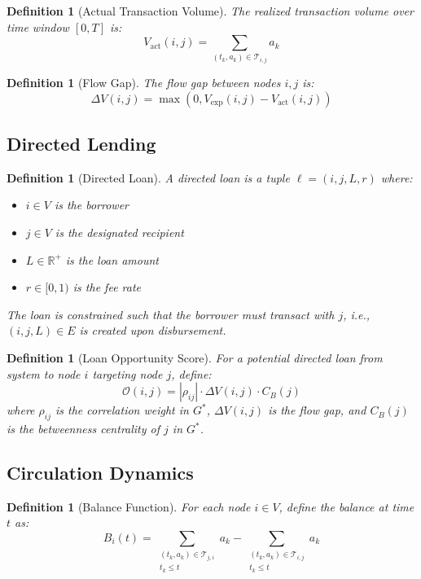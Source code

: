 \documentclass[12pt]{article}
\newtheorem{definition}[theorem]{Definition}
\begin{document}
\begin{definition}[Actual Transaction Volume]
The realized transaction volume over time window $[0,T]$ is:
$$
V_{\text{act}}(i,j) = \sum_{(t_k, a_k) \in \mathcal{T}_{i,j}} a_k
$$
\end{definition}

\begin{definition}[Flow Gap]
The flow gap between nodes $i,j$ is:
$$
\Delta V(i,j) = \max(0, V_{\text{exp}}(i,j) - V_{\text{act}}(i,j))
$$
\end{definition}

\subsection{Directed Lending}

\begin{definition}[Directed Loan]
A directed loan is a tuple $\ell = (i, j, L, r)$ where:
\begin{itemize}
    \item $i \in V$ is the borrower
    \item $j \in V$ is the designated recipient
    \item $L \in \mathbb{R}^+$ is the loan amount
    \item $r \in [0,1)$ is the fee rate
\end{itemize}
The loan is constrained such that the borrower must transact with $j$, i.e., $(i,j,L) \in E$ is created upon disbursement.
\end{definition}

\begin{definition}[Loan Opportunity Score]
For a potential directed loan from system to node $i$ targeting node $j$, define:
$$
\mathcal{O}(i,j) = |\rho_{ij}| \cdot \Delta V(i,j) \cdot C_B(j)
$$
where $\rho_{ij}$ is the correlation weight in $G^*$, $\Delta V(i,j)$ is the flow gap, and $C_B(j)$ is the betweenness centrality of $j$ in $G^*$.
\end{definition}

\subsection{Circulation Dynamics}

\begin{definition}[Balance Function]
For each node $i \in V$, define the balance at time $t$ as:
$$
B_i(t) = \sum_{\substack{(t_k, a_k) \in \mathcal{T}_{j,i} \\ t_k \leq t}} a_k - \sum_{\substack{(t_k, a_k) \in \mathcal{T}_{i,j} \\ t_k \leq t}} a_k
$$
\end{definition}
\end{document}
